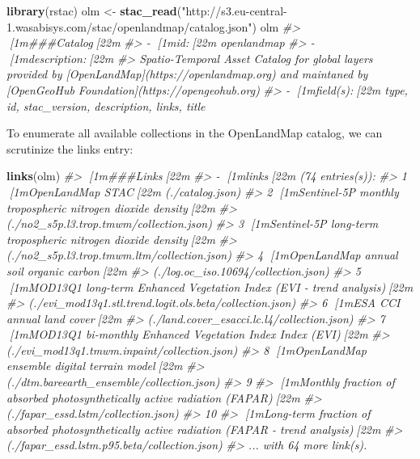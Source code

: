 \documentclass[
  graybox,natbib,nospthms]{svmono}
\newenvironment{Shaded}{\begin{snugshade}}{\end{snugshade}}
\newcommand{\CommentTok}[1]{\textcolor[rgb]{0.37,0.37,0.37}{\textit{#1}}}
\newcommand{\FunctionTok}[1]{\textcolor[rgb]{0.27,0.27,0.27}{\textbf{#1}}}
\newcommand{\NormalTok}[1]{#1}
\newcommand{\OtherTok}[1]{\textcolor[rgb]{0.37,0.37,0.37}{#1}}
\newcommand{\StringTok}[1]{\textcolor[rgb]{0.5,0.5,0.5}{#1}}
\begin{document}
\begin{Shaded}
\begin{Highlighting}[]
\FunctionTok{library}\NormalTok{(rstac)}
\NormalTok{olm }\OtherTok{\textless{}{-}} \FunctionTok{stac\_read}\NormalTok{(}\StringTok{"http://s3.eu{-}central{-}1.wasabisys.com/stac/openlandmap/catalog.json"}\NormalTok{)}
\NormalTok{olm}
\CommentTok{\#\textgreater{} [1m\#\#\#Catalog[22m}
\CommentTok{\#\textgreater{} {-} [1mid:[22m openlandmap}
\CommentTok{\#\textgreater{} {-} [1mdescription:[22m }
\CommentTok{\#\textgreater{} Spatio{-}Temporal Asset Catalog for global layers provided by [OpenLandMap](https://openlandmap.org) and maintaned by [OpenGeoHub Foundation](https://opengeohub.org)}
\CommentTok{\#\textgreater{} {-} [1mfield(s):[22m type, id, stac\_version, description, links, title}
\end{Highlighting}
\end{Shaded}

To enumerate all available collections in the OpenLandMap catalog, we can scrutinize the links entry:

\begin{Shaded}
\begin{Highlighting}[]
\FunctionTok{links}\NormalTok{(olm)}
\CommentTok{\#\textgreater{} [1m\#\#\#Links[22m}
\CommentTok{\#\textgreater{} {-} [1mlinks[22m (74 entries(s)):}
\CommentTok{\#\textgreater{}  1 [1mOpenLandMap STAC[22m (./catalog.json)}
\CommentTok{\#\textgreater{}  2 [1mSentinel{-}5P monthly tropospheric nitrogen dioxide density[22m }
\CommentTok{\#\textgreater{} (./no2\_s5p.l3.trop.tmwm/collection.json)}
\CommentTok{\#\textgreater{}  3 [1mSentinel{-}5P long{-}term tropospheric nitrogen dioxide density[22m }
\CommentTok{\#\textgreater{} (./no2\_s5p.l3.trop.tmwm.ltm/collection.json)}
\CommentTok{\#\textgreater{}  4 [1mOpenLandMap annual soil organic carbon[22m }
\CommentTok{\#\textgreater{} (./log.oc\_iso.10694/collection.json)}
\CommentTok{\#\textgreater{}  5 [1mMOD13Q1 long{-}term Enhanced Vegetation Index (EVI {-} trend analysis)[22m }
\CommentTok{\#\textgreater{} (./evi\_mod13q1.stl.trend.logit.ols.beta/collection.json)}
\CommentTok{\#\textgreater{}  6 [1mESA CCI annual land cover[22m }
\CommentTok{\#\textgreater{} (./land.cover\_esacci.lc.l4/collection.json)}
\CommentTok{\#\textgreater{}  7 [1mMOD13Q1 bi{-}monthly Enhanced Vegetation Index Index (EVI)[22m }
\CommentTok{\#\textgreater{} (./evi\_mod13q1.tmwm.inpaint/collection.json)}
\CommentTok{\#\textgreater{}  8 [1mOpenLandMap ensemble digital terrain model[22m }
\CommentTok{\#\textgreater{} (./dtm.bareearth\_ensemble/collection.json)}
\CommentTok{\#\textgreater{}  9 }
\CommentTok{\#\textgreater{} [1mMonthly fraction of absorbed photosynthetically active radiation (FAPAR)[22m }
\CommentTok{\#\textgreater{} (./fapar\_essd.lstm/collection.json)}
\CommentTok{\#\textgreater{} 10 }
\CommentTok{\#\textgreater{} [1mLong{-}term fraction of absorbed photosynthetically active radiation (FAPAR {-} trend analysis)[22m }
\CommentTok{\#\textgreater{} (./fapar\_essd.lstm.p95.beta/collection.json)}
\CommentTok{\#\textgreater{}   ... with 64 more link(s).}
\end{Highlighting}
\end{Shaded}
\end{document}
